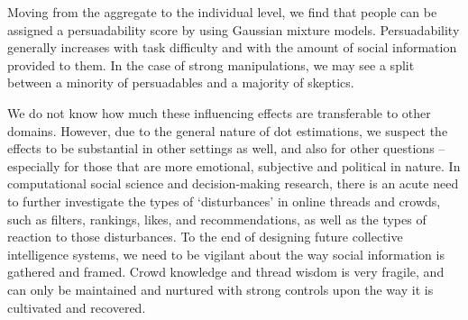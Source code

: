\documentclass[9pt,twocolumn,twoside,lineno]{article}
\begin{document}
Moving from the aggregate to the individual level, we find that people can be assigned a persuadability score by using Gaussian mixture models. Persuadability generally increases with task difficulty and with the amount of social information provided to them. In the case of strong manipulations, we may see a split between a minority of persuadables and a majority of skeptics.

We do not know how much these influencing effects are transferable to other domains. However, due to the general nature of dot estimations, we suspect the effects to be substantial in other settings as well, and also for other questions – especially for those that are more emotional, subjective and political in nature. In computational social science and decision-making research,  there is an acute need to further investigate the types of ‘disturbances’ in online threads and crowds, such as filters, rankings, likes, and recommendations, as well as the types of reaction to those disturbances. To the end of designing future collective intelligence systems, we need to be vigilant about the way social information is gathered and framed. Crowd knowledge and thread wisdom is very fragile, and can only be maintained and nurtured with strong controls upon the way it is cultivated and recovered.
\end{document}
